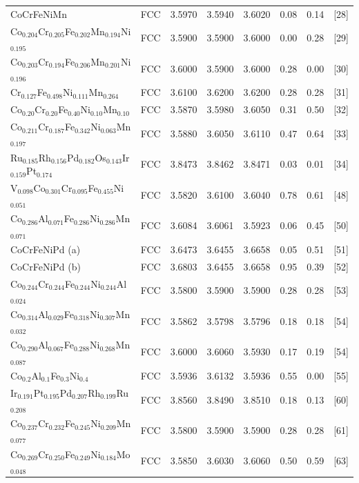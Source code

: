\documentclass[a4paper,10pt,5p]{elsarticle}
\begin{document}
\begin{table}[htbp]
\begin{tabular}{lccccccc}
    CoCrFeNiMn & FCC & 3.5970 & 3.5940 & 3.6020 & 0.08 & 0.14 & [28] \\
    Co$_{0.204}$Cr$_{0.205}$Fe$_{0.202}$Mn$_{0.194}$Ni$_{0.195}$ & FCC & 3.5900 & 3.5900 & 3.6000 & 0.00 & 0.28 & [29] \\
    Co$_{0.203}$Cr$_{0.194}$Fe$_{0.206}$Mn$_{0.201}$Ni$_{0.196}$ & FCC & 3.6000 & 3.5900 & 3.6000 & 0.28 & 0.00 & [30] \\
    Cr$_{0.127}$Fe$_{0.498}$Ni$_{0.111}$Mn$_{0.264}$ & FCC & 3.6100 & 3.6200 & 3.6200 & 0.28 & 0.28 & [31] \\
    Co$_{0.20}$Cr$_{0.20}$Fe$_{0.40}$Ni$_{0.10}$Mn$_{0.10}$ & FCC & 3.5870 & 3.5980 & 3.6050 & 0.31 & 0.50 & [32] \\
    Co$_{0.211}$Cr$_{0.187}$Fe$_{0.342}$Ni$_{0.063}$Mn$_{0.197}$ & FCC & 3.5880 & 3.6050 & 3.6110 & 0.47 & 0.64 & [33] \\
    Ru$_{0.185}$Rh$_{0.156}$Pd$_{0.182}$Os$_{0.143}$Ir$_{0.159}$Pt$_{0.174}$ & FCC & 3.8473 & 3.8462 & 3.8471 & 0.03 & 0.01 & [34] \\
    V$_{0.098}$Co$_{0.301}$Cr$_{0.095}$Fe$_{0.455}$Ni$_{0.051}$ & FCC & 3.5820 & 3.6100 & 3.6040 & 0.78 & 0.61 & [48] \\
    Co$_{0.286}$Al$_{0.071}$Fe$_{0.286}$Ni$_{0.286}$Mn$_{0.071}$ & FCC & 3.6084 & 3.6061 & 3.5923 & 0.06 & 0.45 & [50] \\
    CoCrFeNiPd (a) & FCC & 3.6473 & 3.6455 & 3.6658 & 0.05 & 0.51 & [51] \\
    CoCrFeNiPd (b) & FCC & 3.6803 & 3.6455 & 3.6658 & 0.95 & 0.39 & [52] \\
    Co$_{0.244}$Cr$_{0.244}$Fe$_{0.244}$Ni$_{0.244}$Al$_{0.024}$ & FCC & 3.5800 & 3.5900 & 3.5900 & 0.28 & 0.28 & [53] \\
    Co$_{0.314}$Al$_{0.029}$Fe$_{0.318}$Ni$_{0.307}$Mn$_{0.032}$ & FCC & 3.5862 & 3.5798 & 3.5796 & 0.18 & 0.18 & [54] \\
    Co$_{0.290}$Al$_{0.067}$Fe$_{0.288}$Ni$_{0.268}$Mn$_{0.087}$ & FCC & 3.6000 & 3.6060 & 3.5930 & 0.17 & 0.19 & [54] \\
    Co$_{0.2}$Al$_{0.1}$Fe$_{0.3}$Ni$_{0.4}$ & FCC & 3.5936 & 3.6132 & 3.5936 & 0.55 & 0.00 & [55] \\
    Ir$_{0.191}$Pt$_{0.195}$Pd$_{0.207}$Rh$_{0.199}$Ru$_{0.208}$ & FCC & 3.8560 & 3.8490 & 3.8510 & 0.18 & 0.13 & [60] \\
    Co$_{0.237}$Cr$_{0.232}$Fe$_{0.245}$Ni$_{0.209}$Mn$_{0.077}$ & FCC & 3.5800 & 3.5900 & 3.5900 & 0.28 & 0.28 & [61] \\
    Co$_{0.269}$Cr$_{0.250}$Fe$_{0.249}$Ni$_{0.184}$Mo$_{0.048}$ & FCC & 3.5850 & 3.6030 & 3.6060 & 0.50 & 0.59 & [63] \\

\end{tabular}
\end{table}
\end{document}
